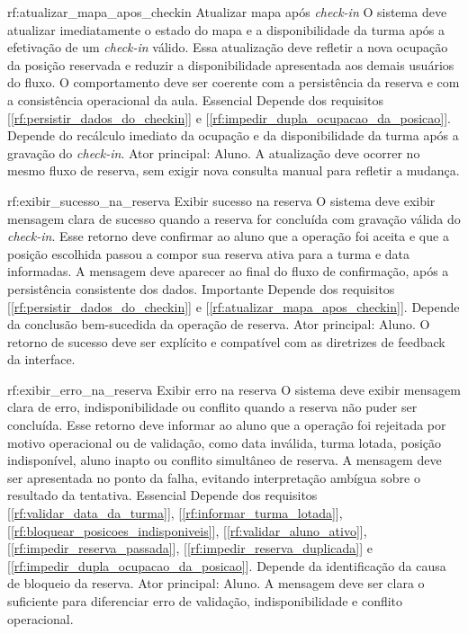 \reqfuncfull
{rf:atualizar_mapa_apos_checkin}
{Atualizar mapa após \textit{check-in}}
{O sistema deve atualizar imediatamente o estado do mapa e a disponibilidade da turma após a efetivação de um \textit{check-in} válido. Essa atualização deve refletir a nova ocupação da posição reservada e reduzir a disponibilidade apresentada aos demais usuários do fluxo. O comportamento deve ser coerente com a persistência da reserva e com a consistência operacional da aula.}
{Essencial}
{Depende dos requisitos [\ref{rf:persistir_dados_do_checkin}] e [\ref{rf:impedir_dupla_ocupacao_da_posicao}]. Depende do recálculo imediato da ocupação e da disponibilidade da turma após a gravação do \textit{check-in}.}
{Ator principal: Aluno. A atualização deve ocorrer no mesmo fluxo de reserva, sem exigir nova consulta manual para refletir a mudança.}

\reqfuncfull
{rf:exibir_sucesso_na_reserva}
{Exibir sucesso na reserva}
{O sistema deve exibir mensagem clara de sucesso quando a reserva for concluída com gravação válida do \textit{check-in}. Esse retorno deve confirmar ao aluno que a operação foi aceita e que a posição escolhida passou a compor sua reserva ativa para a turma e data informadas. A mensagem deve aparecer ao final do fluxo de confirmação, após a persistência consistente dos dados.}
{Importante}
{Depende dos requisitos [\ref{rf:persistir_dados_do_checkin}] e [\ref{rf:atualizar_mapa_apos_checkin}]. Depende da conclusão bem-sucedida da operação de reserva.}
{Ator principal: Aluno. O retorno de sucesso deve ser explícito e compatível com as diretrizes de feedback da interface.}

\reqfuncfull
{rf:exibir_erro_na_reserva}
{Exibir erro na reserva}
{O sistema deve exibir mensagem clara de erro, indisponibilidade ou conflito quando a reserva não puder ser concluída. Esse retorno deve informar ao aluno que a operação foi rejeitada por motivo operacional ou de validação, como data inválida, turma lotada, posição indisponível, aluno inapto ou conflito simultâneo de reserva. A mensagem deve ser apresentada no ponto da falha, evitando interpretação ambígua sobre o resultado da tentativa.}
{Essencial}
{Depende dos requisitos [\ref{rf:validar_data_da_turma}], [\ref{rf:informar_turma_lotada}], [\ref{rf:bloquear_posicoes_indisponiveis}], [\ref{rf:validar_aluno_ativo}], [\ref{rf:impedir_reserva_passada}], [\ref{rf:impedir_reserva_duplicada}] e [\ref{rf:impedir_dupla_ocupacao_da_posicao}]. Depende da identificação da causa de bloqueio da reserva.}
{Ator principal: Aluno. A mensagem deve ser clara o suficiente para diferenciar erro de validação, indisponibilidade e conflito operacional.}

